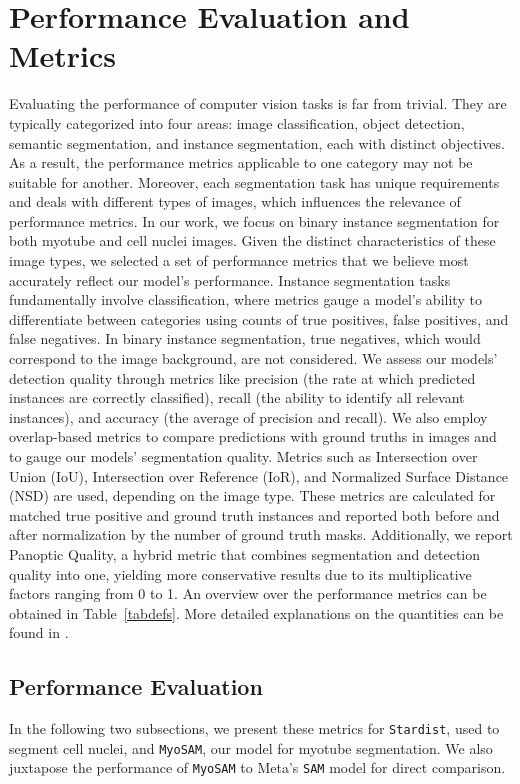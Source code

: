 \section{Performance Evaluation and Metrics}\label{secperformance}
Evaluating the performance of computer vision tasks is far from trivial. They are typically categorized into four areas: image classification, object detection, semantic segmentation, and instance segmentation, each with distinct objectives. As a result, the performance metrics applicable to one category may not be suitable for another. Moreover, each segmentation task has unique requirements and deals with different types of images, which influences the relevance of performance metrics. In our work, we focus on binary instance segmentation for both myotube and cell nuclei images. Given the distinct characteristics of these image types, we selected a set of performance metrics that we believe most accurately reflect our model's performance.
Instance segmentation tasks fundamentally involve classification, where metrics gauge a model's ability to differentiate between categories using counts of true positives, false positives, and false negatives. In binary instance segmentation, true negatives, which would correspond to the image background, are not considered. We assess our models' detection quality through metrics like precision (the rate at which predicted instances are correctly classified), recall (the ability to identify all relevant instances), and accuracy (the average of precision and recall). We also employ overlap-based metrics to compare predictions with ground truths in images and to gauge our models' segmentation quality. Metrics such as Intersection over Union (IoU), Intersection over Reference (IoR), and Normalized Surface Distance (NSD) are used, depending on the image type. These metrics are calculated for matched true positive and ground truth instances and reported both before and after normalization by the number of ground truth masks. Additionally, we report Panoptic Quality, a hybrid metric that combines segmentation and detection quality into one, yielding more conservative results due to its multiplicative factors ranging from 0 to 1. An overview over the performance metrics can be obtained in Table~\ref{tabdefs}. More detailed explanations on the quantities can be found in \cite{metricsreloaded}.


\subsection{Performance Evaluation}
In the following two subsections, we present these metrics for \texttt{Stardist}, used to segment cell nuclei, and \texttt{MyoSAM}, our model for myotube segmentation. We also juxtapose the performance of \texttt{MyoSAM} to Meta’s \texttt{SAM} model for direct comparison.
